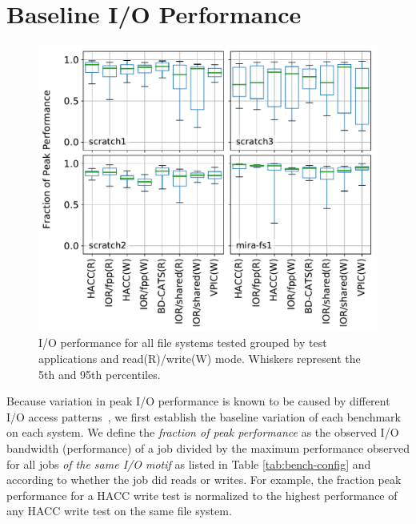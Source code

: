 \section{Baseline I/O Performance} \label{sec:results}

\begin{figure}[t]
    \centering
    \includegraphics[width=1.0\columnwidth]{figs/perf-boxplots.pdf}
    \vspace{-.25in}
    \caption{I/O performance for all file systems tested grouped by test
    applications and read(R)/write(W) mode.  Whiskers represent the 5th and 95th
    percentiles.}
    \label{fig:perf-summary-boxplots-motif}
	\vspace{-.3in}
\end{figure}

Because variation in peak I/O performance is known to be caused by different I/O access patterns~\cite{Lofstead2010,Uselton2010,Xie2012}, we first establish the baseline variation of each benchmark on each system.
We define the \emph{fraction of peak performance} as the observed I/O bandwidth (performance) of a job divided by the maximum performance observed for all jobs \emph{of the same I/O motif} as listed in Table \ref{tab:bench-config} and according to whether the job did reads or writes.
For example, the fraction peak performance for a HACC write test is normalized to the highest performance of any HACC write test on the same file system.

